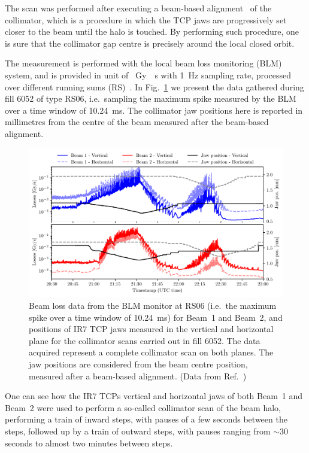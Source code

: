 The scan was performed after executing a beam-based alignment~\cite{valentino2012semiautomatic} of the collimator, which is a procedure in which the TCP jaws are progressively set closer to the beam until the halo is touched. By performing such procedure, one is sure that the collimator gap centre is precisely around the local closed orbit.

The measurement is performed with the local beam loss monitoring (BLM) system, and is provided in unit of \SI{}{Gy \per s} with \SI{1}{Hz} sampling rate, processed over different running sums (RS)~\cite{Bruning:782076}. In Fig.~\ref{fig:raw_data} we present the data gathered during fill 6052 of type RS06, i.e.\ sampling the maximum spike measured by the BLM over a time window of \SI{10.24}{ms}. The collimator jaw positions here is reported in millimetres from the centre of the beam measured after the beam-based alignment.

\begin{figure}[htp]
    \centering
    \includegraphics[width=\textwidth]{5_Diffusion_measurement_LHC/figs/raw.pdf}
    \caption{Beam loss data from the BLM monitor at RS06 (i.e.\ the maximum spike over a time window of \SI{10.24}{ms}) for Beam~1 and Beam~2, and positions of IR7 TCP jaws measured in the vertical and horizontal plane for the collimator scans carried out in fill 6052. The data acquired represent a complete collimator scan on both planes. The jaw positions are considered from the beam centre position, measured after a beam-based alignment. (Data from Ref.~\cite{PhysRevAccelBeams.23.044802})}
    \label{fig:raw_data}
\end{figure}

One can see how the IR7 TCPs vertical and horizontal jaws of both Beam~1 and Beam~2 were used to perform a so-called collimator scan of the beam halo, performing a train of inward steps, with pauses of a few seconds between the steps, followed up by a train of outward steps, with pauses ranging from $\sim30$ seconds to almost two minutes between steps.

